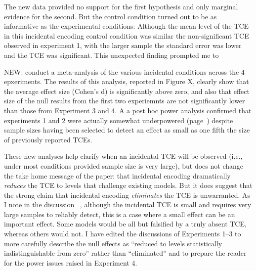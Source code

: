 \documentclass[12pt]{article}
\begin{document}
The new data provided no support for the first hypothesis and only marginal evidence for the second. But the control condition turned out to be as informative as the experimental conditions: Although the mean level of the TCE in this incidental encoding control condition was similar the non-significant TCE observed in experiment 1, with the larger sample the standard error was lower and the TCE was significant. This unexpected finding prompted me to 

NEW: conduct a meta-analysis of the various incidental conditions across the 4 epxeriments. The results of this analysis, reported in Figure X, clearly show that the average effect size (Cohen's d) is significantly above zero, and also that effect size of the null results from the first two experiemnts are not significantly lower than those from Experiment 3 and 4. A a post hoc power analysis confirmed that experiments 1 and 2 were actually somewhat underpowered (page~\pageref{power}) despite sample sizes having been selected to detect an effect as small as one fifth the size of previously reported TCEs.




These new analyses help clarify when an incidental TCE will be observed (i.e., under most conditions provided sample size is very large), but does not change the take home message of the paper: that incidental encoding dramatically \emph{reduces} the TCE to levels that challenge existing models. But it does suggest that the strong claim that incidental encoding \emph{eliminates} the TCE is unwarranted. As I note in the discussion ~\pageref{zerovsnear}, although the incidental TCE is small and requires very large samples to reliably detect, this is a case where a small effect can be an important effect. Some models would be all but falsified by a truly absent TCE, whereas others would not. I have edited the discussions of Experiments 1--3 to more carefully describe the null effects as ``reduced to levels statistically indistinguishable from zero'' rather than ``eliminated'' and to prepare the reader for the power issues raised in Experiment 4.
\end{document}

